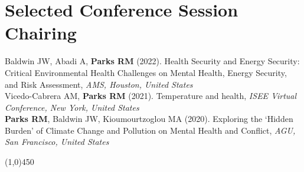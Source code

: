 \section*{Selected Conference Session Chairing}

\noindent Baldwin JW,  Abadi A, \textbf{Parks RM} (2022). Health Security and Energy Security: Critical Environmental Health Challenges on Mental Health, Energy Security, and Risk Assessment, \textit{AMS, Houston, United States}\\

\noindent Vicedo-Cabrera AM, \textbf{Parks RM} (2021). Temperature and health, \textit{ISEE Virtual Conference, New York, United States}\\

\noindent \textbf{Parks RM}, Baldwin JW,  Kioumourtzoglou MA (2020). Exploring the ‘Hidden Burden’ of Climate Change and Pollution on Mental Health and Conflict, \textit{AGU, San Francisco, United States}

\begin{center} \line(1,0){450} \end{center}